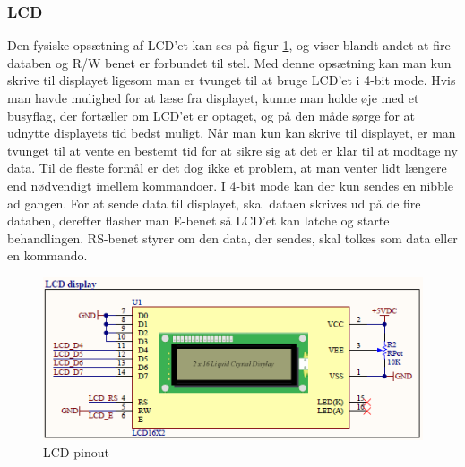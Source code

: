 \subsubsection{LCD}

Den fysiske opsætning af LCD'et kan ses på figur \ref{fig:LCD}, og viser blandt andet at fire databen og R/W benet er forbundet til stel. Med denne opsætning kan man kun skrive til displayet ligesom man er tvunget til at bruge LCD'et i 4-bit mode. Hvis man havde mulighed for at læse fra displayet, kunne man holde øje med et busyflag, der fortæller om LCD'et er optaget, og på den måde sørge for at udnytte displayets tid bedst muligt. Når man kun kan skrive til displayet, er man tvunget til at vente en bestemt tid for at sikre sig at det er klar til at modtage ny data. Til de fleste formål er det dog ikke et problem, at man venter lidt længere end nødvendigt imellem kommandoer. I 4-bit mode kan der kun sendes en nibble ad gangen. For at sende data til displayet, skal dataen skrives ud på de fire databen, derefter flasher man E-benet så LCD'et kan latche og starte behandlingen. RS-benet styrer om den data, der sendes, skal tolkes som data eller en kommando. 

\begin{figure}[ht]
			\begin{center}
			\includegraphics[scale=0.9]{Billeder/LCD.PNG}
			\end{center}
			\caption{LCD pinout}
			\label{fig:LCD}
\end{figure}

